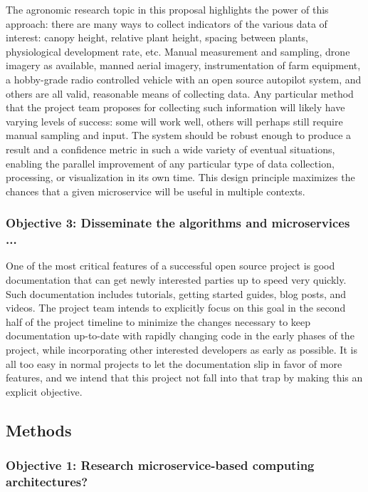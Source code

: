 \documentclass[11pt]{article}
\begin{document}
The agronomic research topic in this proposal highlights the power of this approach: there are many ways to collect 
indicators of the various data of interest: canopy height, relative plant height, spacing between plants, physiological 
development rate, etc.  Manual measurement and sampling, drone imagery as available, manned aerial imagery, 
instrumentation of farm equipment, a hobby-grade radio controlled vehicle with an open source autopilot system, and 
others are all valid, reasonable means of collecting data.  Any particular method that the project team proposes for 
collecting such information will likely have varying levels of success: some will work well, others will perhaps still 
require manual sampling and input.  The system should be robust enough to produce a result and a confidence 
metric in such a wide variety of eventual situations, enabling the parallel improvement of any particular type of 
data collection, processing, or visualization in its own time.  This design principle maximizes the chances that a 
given microservice will be useful in multiple contexts.  

\subsubsection{Objective 3: Disseminate the algorithms and microservices ...}   

One of the most critical features of a successful open source project is good documentation that can get newly 
interested parties up to speed very quickly.  Such documentation includes tutorials, getting started guides, blog posts, 
and videos.  The project team intends to explicitly focus on this goal in the second half of the project timeline to 
minimize the changes necessary to keep documentation up-to-date with rapidly changing code in the early phases 
of the project, while incorporating other interested developers as early as possible.  It is all too easy in normal 
projects to let the documentation slip in favor of more features, and we intend that this project not fall into that 
trap by making this an explicit objective.

\subsection{Methods}

\subsubsection{Objective 1: Research microservice-based computing architectures?}
\end{document}
